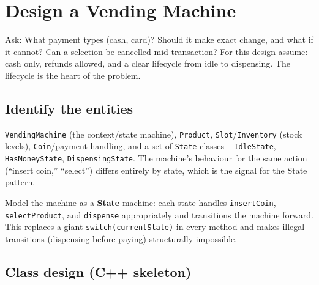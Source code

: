 \section{Design a Vending Machine}
\label{sec:case-vending}


\begin{patternbox}
Ask: What payment types (cash, card)? Should it make exact change, and
what if it cannot? Can a selection be cancelled mid-transaction? For this
design assume: cash only, refunds allowed, and a clear lifecycle from idle
to dispensing. The lifecycle is the heart of the problem.
\end{patternbox}

\subsection*{Identify the entities}

\texttt{VendingMachine} (the context/state machine), \texttt{Product},
\texttt{Slot}/\texttt{Inventory} (stock levels), \texttt{Coin}/payment
handling, and a set of \texttt{State} classes -- \texttt{IdleState},
\texttt{HasMoneyState}, \texttt{DispensingState}. The machine's behaviour
for the same action (``insert coin,'' ``select'') differs entirely by
state, which is the signal for the State pattern.

\begin{ideabox}
Model the machine as a \textbf{State} machine: each state handles
\texttt{insertCoin}, \texttt{selectProduct}, and \texttt{dispense}
appropriately and transitions the machine forward. This replaces a giant
\texttt{switch(currentState)} in every method and makes illegal
transitions (dispensing before paying) structurally impossible.
\end{ideabox}

\subsection*{Class design (C++ skeleton)}

